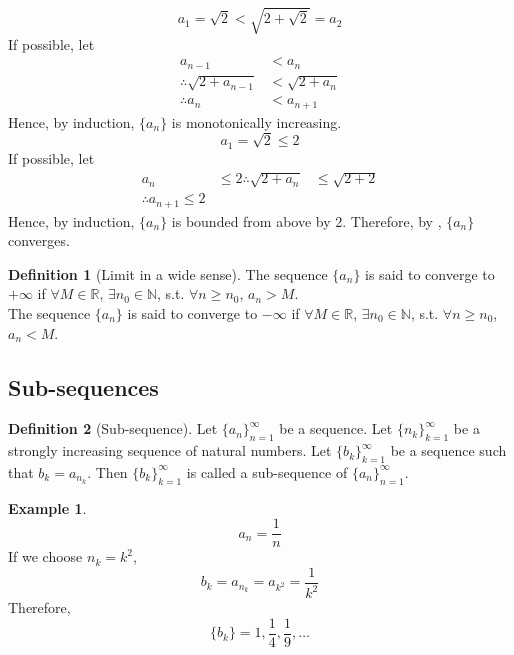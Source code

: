 \documentclass[fleqn, a4paper, 12pt, twoside]{article}
\theoremstyle{definition}
\newtheorem{example}{Example}
\newtheorem{definition}{Definition}
\theoremstyle{theorem}
\begin{document}
{\begin{solution}[print]
	\begin{equation*}
		a_1 = \sqrt{2} < \sqrt{2 + \sqrt{2}} = a_2
	\end{equation*}
	If possible, let
	\begin{align*}
		a_{n - 1} &< a_n\\
		\therefore \sqrt{2 + a_{n - 1}} &< \sqrt{2 + a_n}\\
		\therefore a_n &< a_{n + 1}
	\end{align*}
	Hence, by induction, $\{a_n\}$ is monotonically increasing.
	~\\
	\begin{equation*}
		a_1 = \sqrt{2} \leq 2
	\end{equation*}
	If possible, let
	\begin{align*}
		a_n &\leq 2
		\therefore \sqrt{2 + a_n} &\leq \sqrt{2 + 2}\\
		\therefore a_{n + 1} \leq 2
	\end{align*}
	Hence, by induction, $\{a_n\}$ is bounded from above by 2.
	Therefore, by , $\{a_n\}$ converges.
\end{solution}

\begin{definition}[Limit in a wide sense]
	The sequence $\{a_n\}$ is said to converge to $+\infty$ if $\forall M \in \mathbb{R}$, $\exists n_0 \in \mathbb{N}$, s.t. $\forall n \geq n_0$, $a_n > M$.\\
	The sequence $\{a_n\}$ is said to converge to $-\infty$ if $\forall M \in \mathbb{R}$, $\exists n_0 \in \mathbb{N}$, s.t. $\forall n \geq n_0$, $a_n < M$.
\end{definition}

\subsection{Sub-sequences}

\begin{definition}[Sub-sequence]
	Let $\{a_n\}_{n = 1} ^{\infty}$ be a sequence.
	Let $\{n_k\}_{k = 1}^{\infty}$ be a strongly increasing sequence of natural numbers.
	Let $\{b_k\}_{k = 1}^{\infty}$ be a sequence such that $b_k = a_{n_k}$.
	Then $\{b_k\}_{k = 1}^{\infty}$ is called a sub-sequence of $\{a_n\}_{n = 1}^{\infty}$.
\end{definition}

\begin{example}
	\begin{equation*}
	a_n = \dfrac{1}{n}
	\end{equation*}
	If we choose $n_k = k^2$,
	\begin{equation*}
		b_k = a_{n_k} = a_{k^2} = \dfrac{1}{k^2}
	\end{equation*}
	Therefore,
	\begin{equation*}
		\{b_k\} = 1, \dfrac{1}{4}, \dfrac{1}{9}, \dots
	\end{equation*}
\end{example}

}
\end{document}
